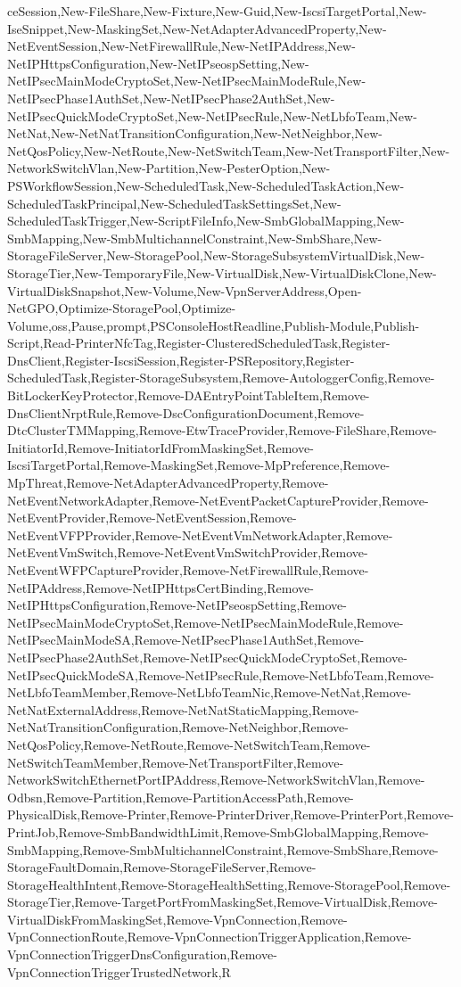 {ceSession,New-FileShare,New-Fixture,New-Guid,New-IscsiTargetPortal,New-IseSnippet,New-MaskingSet,New-NetAdapterAdvancedProperty,New-NetEventSession,New-NetFirewallRule,New-NetIPAddress,New-NetIPHttpsConfiguration,New-NetIPseospSetting,New-NetIPsecMainModeCryptoSet,New-NetIPsecMainModeRule,New-NetIPsecPhase1AuthSet,New-NetIPsecPhase2AuthSet,New-NetIPsecQuickModeCryptoSet,New-NetIPsecRule,New-NetLbfoTeam,New-NetNat,New-NetNatTransitionConfiguration,New-NetNeighbor,New-NetQosPolicy,New-NetRoute,New-NetSwitchTeam,New-NetTransportFilter,New-NetworkSwitchVlan,New-Partition,New-PesterOption,New-PSWorkflowSession,New-ScheduledTask,New-ScheduledTaskAction,New-ScheduledTaskPrincipal,New-ScheduledTaskSettingsSet,New-ScheduledTaskTrigger,New-ScriptFileInfo,New-SmbGlobalMapping,New-SmbMapping,New-SmbMultichannelConstraint,New-SmbShare,New-StorageFileServer,New-StoragePool,New-StorageSubsystemVirtualDisk,New-StorageTier,New-TemporaryFile,New-VirtualDisk,New-VirtualDiskClone,New-VirtualDiskSnapshot,New-Volume,New-VpnServerAddress,Open-NetGPO,Optimize-StoragePool,Optimize-Volume,oss,Pause,prompt,PSConsoleHostReadline,Publish-Module,Publish-Script,Read-PrinterNfcTag,Register-ClusteredScheduledTask,Register-DnsClient,Register-IscsiSession,Register-PSRepository,Register-ScheduledTask,Register-StorageSubsystem,Remove-AutologgerConfig,Remove-BitLockerKeyProtector,Remove-DAEntryPointTableItem,Remove-DnsClientNrptRule,Remove-DscConfigurationDocument,Remove-DtcClusterTMMapping,Remove-EtwTraceProvider,Remove-FileShare,Remove-InitiatorId,Remove-InitiatorIdFromMaskingSet,Remove-IscsiTargetPortal,Remove-MaskingSet,Remove-MpPreference,Remove-MpThreat,Remove-NetAdapterAdvancedProperty,Remove-NetEventNetworkAdapter,Remove-NetEventPacketCaptureProvider,Remove-NetEventProvider,Remove-NetEventSession,Remove-NetEventVFPProvider,Remove-NetEventVmNetworkAdapter,Remove-NetEventVmSwitch,Remove-NetEventVmSwitchProvider,Remove-NetEventWFPCaptureProvider,Remove-NetFirewallRule,Remove-NetIPAddress,Remove-NetIPHttpsCertBinding,Remove-NetIPHttpsConfiguration,Remove-NetIPseospSetting,Remove-NetIPsecMainModeCryptoSet,Remove-NetIPsecMainModeRule,Remove-NetIPsecMainModeSA,Remove-NetIPsecPhase1AuthSet,Remove-NetIPsecPhase2AuthSet,Remove-NetIPsecQuickModeCryptoSet,Remove-NetIPsecQuickModeSA,Remove-NetIPsecRule,Remove-NetLbfoTeam,Remove-NetLbfoTeamMember,Remove-NetLbfoTeamNic,Remove-NetNat,Remove-NetNatExternalAddress,Remove-NetNatStaticMapping,Remove-NetNatTransitionConfiguration,Remove-NetNeighbor,Remove-NetQosPolicy,Remove-NetRoute,Remove-NetSwitchTeam,Remove-NetSwitchTeamMember,Remove-NetTransportFilter,Remove-NetworkSwitchEthernetPortIPAddress,Remove-NetworkSwitchVlan,Remove-Odbsn,Remove-Partition,Remove-PartitionAccessPath,Remove-PhysicalDisk,Remove-Printer,Remove-PrinterDriver,Remove-PrinterPort,Remove-PrintJob,Remove-SmbBandwidthLimit,Remove-SmbGlobalMapping,Remove-SmbMapping,Remove-SmbMultichannelConstraint,Remove-SmbShare,Remove-StorageFaultDomain,Remove-StorageFileServer,Remove-StorageHealthIntent,Remove-StorageHealthSetting,Remove-StoragePool,Remove-StorageTier,Remove-TargetPortFromMaskingSet,Remove-VirtualDisk,Remove-VirtualDiskFromMaskingSet,Remove-VpnConnection,Remove-VpnConnectionRoute,Remove-VpnConnectionTriggerApplication,Remove-VpnConnectionTriggerDnsConfiguration,Remove-VpnConnectionTriggerTrustedNetwork,R}
